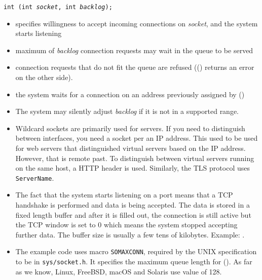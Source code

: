 

\begin{slide}
\texttt{int (int \emph{socket}, int \emph{backlog});}
\begin{itemize}
\item specifies willingness to accept incoming connections on \emph{socket}, and
the system starts listening
\item maximum of \emph{backlog} connection requests may wait in the queue to
be served
\item connection requests that do not fit the queue are refused
(() returns an error on the other side). 
\item the system waits for a connection on an address previously assigned by
()
\end{itemize}
\end{slide}

\begin{itemize}
\item The system may silently adjust \emph{backlog} if it is not in a supported
range.
\item Wildcard sockets are primarily used for servers.  If you need to
distinguish between interfaces, you need a socket per an IP address.  This used
to be used for web servers that distinguished virtual servers based on the IP
address.  However, that is remote past.  To distinguish between virtual servers
running on the same host, a HTTP header  is used.  Similarly,
the TLS protocol uses \texttt{ServerName}.
\item The fact that the system starts listening on a port means that a TCP
handshake is performed and data is being accepted.  The data is stored
in a fixed length buffer and after it is filled out, the connection is still
active but the TCP window is set to 0 which means the system stopped accepting
further data.  The buffer size is usually a few tens of kilobytes.
\label{UP_TO_LISTEN_ONLY_C} Example: .
\item The example code uses macro \texttt{SOMAXCONN}, required by the UNIX
specification to be in \texttt{sys/socket.h}.  It specifies the maximum queue
length for ().  As far as we know, Linux, FreeBSD, macOS and
Solaris use value of 128.
\end{itemize}


